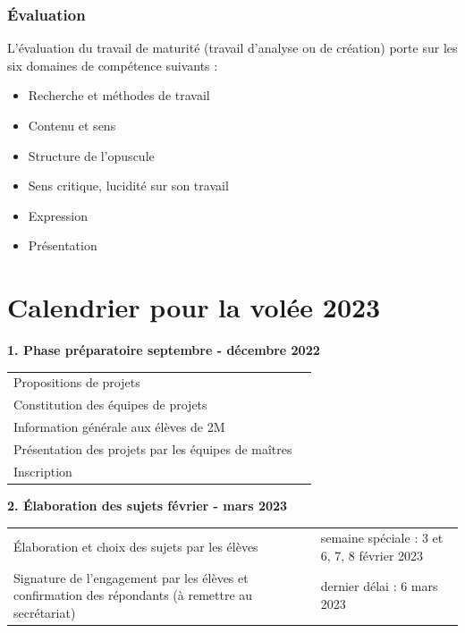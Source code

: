\documentclass[
  10pt,
  french,
  a5paper,
  openany]{book}
\providecommand{\tightlist}{%
  \setlength{\itemsep}{0pt}\setlength{\parskip}{0pt}}
\begin{document}
\hypertarget{uxe9valuation-1}{%
\subsection*{Évaluation}\label{uxe9valuation-1}}

L'évaluation du travail de maturité (travail d'analyse ou de création) porte sur les six domaines de compétence suivants :

\begin{itemize}
\tightlist
\item
  Recherche et méthodes de travail
\item
  Contenu et sens
\item
  Structure de l'opuscule
\item
  Sens critique, lucidité sur son travail
\item
  Expression
\item
  Présentation
\end{itemize}

\hypertarget{calendrier-pour-la-voluxe9e-2023}{%
\chapter*{Calendrier pour la volée 2023}\label{calendrier-pour-la-voluxe9e-2023}}


\textbf{1. Phase préparatoire \hfill septembre - décembre 2022}

\begin{longtable}[]{@{}ll@{}}
\toprule
\endhead
Propositions de projets &\tabularnewline
Constitution des équipes de projets &\tabularnewline
Information générale aux élèves de 2M &\tabularnewline
Présentation des projets par les équipes de maîtres &\tabularnewline
Inscription &\tabularnewline
\bottomrule
\end{longtable}


\textbf{2. Élaboration des sujets \hfill février - mars 2023}

\begin{longtable}[]{@{}ll@{}}
\toprule
\endhead
\begin{minipage}[t]{0.65\columnwidth}\raggedright
Élaboration et choix des sujets par les élèves\strut
\end{minipage} & \begin{minipage}[t]{0.29\columnwidth}\raggedright
semaine spéciale : 3 et 6, 7, 8 février 2023\strut
\end{minipage}\tabularnewline
\begin{minipage}[t]{0.65\columnwidth}\raggedright
Signature de l'engagement par les élèves et confirmation des répondants (à remettre au secrétariat)\strut
\end{minipage} & \begin{minipage}[t]{0.29\columnwidth}\raggedright
dernier délai : 6 mars 2023\strut
\end{minipage}\tabularnewline
\bottomrule
\end{longtable}
\end{document}
